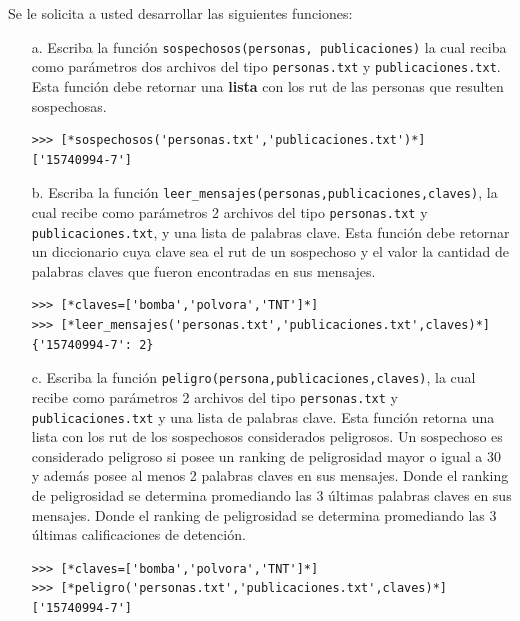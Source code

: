 Se le solicita a usted desarrollar las siguientes funciones:
\begin{itemize}
    \item[a.] Escriba la función \texttt{sospechosos(personas, publicaciones)} la cual reciba como parámetros dos archivos del tipo \texttt{personas.txt} y \texttt{publicaciones.txt}. Esta función debe retornar una \textbf{lista} con los rut de las personas que resulten sospechosas.
\begin{lstlisting}[style=consola]
>>> [*sospechosos('personas.txt','publicaciones.txt')*]
['15740994-7']
\end{lstlisting}
\item[b.]Escriba la función \texttt{leer\_mensajes(personas,publicaciones,claves)}, la cual recibe como parámetros 2 archivos del tipo \texttt{personas.txt} y \texttt{publicaciones.txt}, y una lista de palabras clave. Esta función debe retornar un diccionario cuya clave sea el rut de un sospechoso y el valor la cantidad de palabras claves que fueron encontradas en sus mensajes.
\begin{lstlisting}[style=consola]
>>> [*claves=['bomba','polvora','TNT']*]
>>> [*leer_mensajes('personas.txt','publicaciones.txt',claves)*]
{'15740994-7': 2}
\end{lstlisting}
\item[c.] Escriba la función \texttt{peligro(persona,publicaciones,claves)}, la cual recibe como parámetros 2 archivos del tipo \texttt{personas.txt} y \texttt{publicaciones.txt} y una lista de palabras clave. Esta función retorna una lista con los rut de los sospechosos considerados peligrosos. Un sospechoso es considerado peligroso si posee un ranking de peligrosidad mayor o igual a 30 y además posee al menos 2 palabras claves en sus mensajes. Donde el ranking de peligrosidad se determina promediando las 3 últimas palabras claves en sus mensajes. Donde el ranking de peligrosidad se determina promediando las 3 últimas calificaciones de detención.
\begin{lstlisting}[style=consola]
>>> [*claves=['bomba','polvora','TNT']*]
>>> [*peligro('personas.txt','publicaciones.txt',claves)*]
['15740994-7']
\end{lstlisting}
\end{itemize}